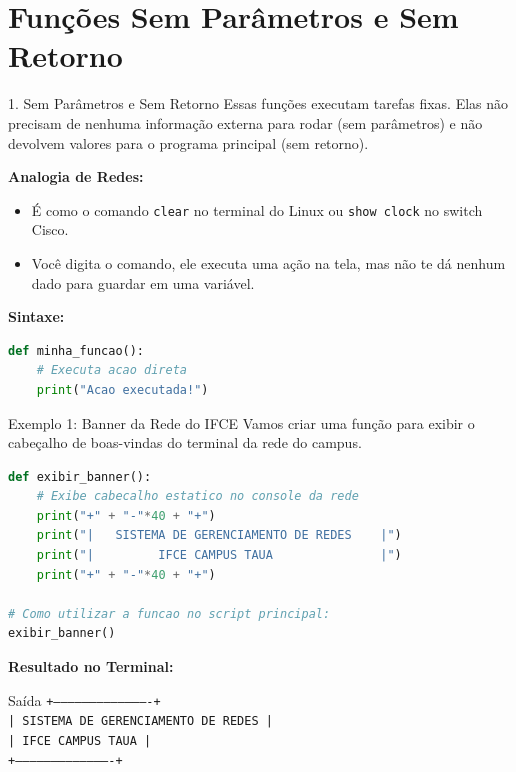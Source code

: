\section{Funções Sem Parâmetros e Sem Retorno}

\begin{frame}[fragile]{1. Sem Parâmetros e Sem Retorno}
    Essas funções executam tarefas fixas. Elas não precisam de nenhuma informação externa para rodar (sem parâmetros) e não devolvem valores para o programa principal (sem retorno).
    
    \vspace{0.3cm}
    \textbf{Analogia de Redes:}
    \begin{itemize}
        \item É como o comando \texttt{clear} no terminal do Linux ou \texttt{show clock} no switch Cisco.
        \item Você digita o comando, ele executa uma ação na tela, mas não te dá nenhum dado para guardar em uma variável.
    \end{itemize}
    
    \vspace{0.3cm}
    \textbf{Sintaxe:}
    \begin{lstlisting}[language=Python]
def minha_funcao():
    # Executa acao direta
    print("Acao executada!")
    \end{lstlisting}
\end{frame}

\begin{frame}[fragile]{Exemplo 1: Banner da Rede do IFCE}
    Vamos criar uma função para exibir o cabeçalho de boas-vindas do terminal da rede do campus.
    
    \begin{lstlisting}[language=Python]
def exibir_banner():
    # Exibe cabecalho estatico no console da rede
    print("+" + "-"*40 + "+")
    print("|   SISTEMA DE GERENCIAMENTO DE REDES    |")
    print("|         IFCE CAMPUS TAUA               |")
    print("+" + "-"*40 + "+")

# Como utilizar a funcao no script principal:
exibir_banner()
    \end{lstlisting}
    
    \vspace{0.2cm}
    \textbf{Resultado no Terminal:}
    \begin{block}{Saída}
        \texttt{+----------------------------------------+}\\
        \texttt{|   SISTEMA DE GERENCIAMENTO DE REDES    |}\\
        \texttt{|         IFCE CAMPUS TAUA               |}\\
        \texttt{+----------------------------------------+}
    \end{block}
\end{frame}

